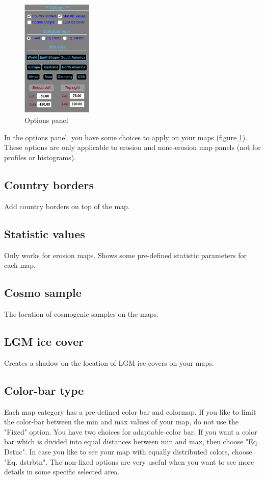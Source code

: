\documentclass[11pt,a4paper,titlepage]{report}
\begin{document}
\begin{figure}
    \vspace{-30pt}
  \begin{center}
    \includegraphics[width=0.30\textwidth]{options1.png}
  \end{center}
  \vspace{-10pt}
  \caption{Options panel}
  \label{fig:options} 
  \vspace{-80pt}
\end{figure}

In the options panel, you have some choices to apply on your maps (figure \ref{fig:options}). These options are only applicable to erosion and none-erosion map panels (not for profiles or histograms).

\subsection{Country borders}
Add country borders on top of the map.
\subsection{Statistic values}
Only works for erosion maps. Shows some pre-defined statistic parameters for each map. 
\subsection{Cosmo sample}
The location of cosmogenic samples on the maps.
\subsection{LGM ice cover}
Creates a shadow on the location of LGM ice covers on your maps.
\subsection{Color-bar type}
Each map category has a pre-defined color bar and colormap. If you like to limit the color-bar between the min and max values of your map, do not use the "Fixed" option. You have two choices for adaptable color bar. If you want a color bar which is divided into equal distances between min and max, then choose "Eq. Dstnc". In case you like to see your map with equally distributed colors, choose "Eq. dstrbtn". The non-fixed options are very useful when you want to see more details in some specific selected area.
\end{document}
